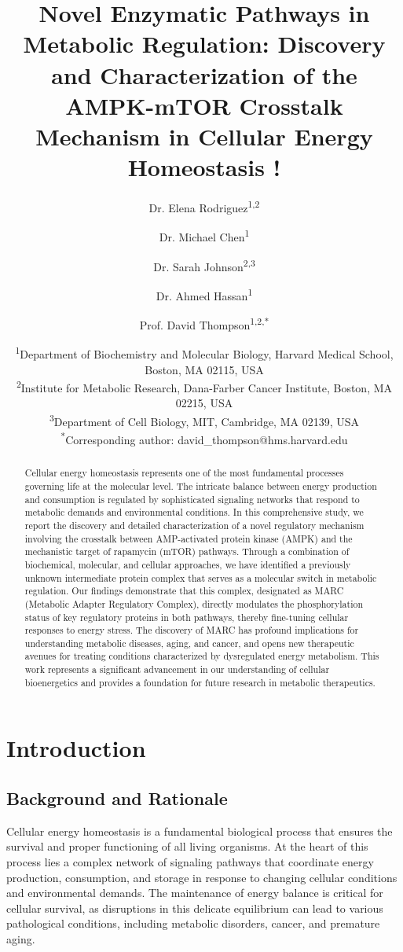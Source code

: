 \documentclass[11pt,a4paper]{article}
\title{Novel Enzymatic Pathways in Metabolic Regulation: Discovery and Characterization of the AMPK-mTOR Crosstalk Mechanism in Cellular Energy Homeostasis !}
\author{Dr. Elena Rodriguez\textsuperscript{1,2} \and 
        Dr. Michael Chen\textsuperscript{1} \and 
        Dr. Sarah Johnson\textsuperscript{2,3} \and 
        Dr. Ahmed Hassan\textsuperscript{1} \and 
        Prof. David Thompson\textsuperscript{1,2,*}}
\date{\textsuperscript{1}Department of Biochemistry and Molecular Biology, Harvard Medical School, Boston, MA 02115, USA\\
\textsuperscript{2}Institute for Metabolic Research, Dana-Farber Cancer Institute, Boston, MA 02215, USA\\
\textsuperscript{3}Department of Cell Biology, MIT, Cambridge, MA 02139, USA\\
\textsuperscript{*}Corresponding author: david\_thompson@hms.harvard.edu}
\begin{document}
\maketitle

\begin{abstract}
Cellular energy homeostasis represents one of the most fundamental processes governing life at the molecular level. The intricate balance between energy production and consumption is regulated by sophisticated signaling networks that respond to metabolic demands and environmental conditions. In this comprehensive study, we report the discovery and detailed characterization of a novel regulatory mechanism involving the crosstalk between AMP-activated protein kinase (AMPK) and the mechanistic target of rapamycin (mTOR) pathways. Through a combination of biochemical, molecular, and cellular approaches, we have identified a previously unknown intermediate protein complex that serves as a molecular switch in metabolic regulation. Our findings demonstrate that this complex, designated as MARC (Metabolic Adapter Regulatory Complex), directly modulates the phosphorylation status of key regulatory proteins in both pathways, thereby fine-tuning cellular responses to energy stress. The discovery of MARC has profound implications for understanding metabolic diseases, aging, and cancer, and opens new therapeutic avenues for treating conditions characterized by dysregulated energy metabolism. This work represents a significant advancement in our understanding of cellular bioenergetics and provides a foundation for future research in metabolic therapeutics.
\end{abstract}

\newpage

\tableofcontents

\newpage

\section{Introduction}

\subsection{Background and Rationale}

Cellular energy homeostasis is a fundamental biological process that ensures the survival and proper functioning of all living organisms. At the heart of this process lies a complex network of signaling pathways that coordinate energy production, consumption, and storage in response to changing cellular conditions and environmental demands. The maintenance of energy balance is critical for cellular survival, as disruptions in this delicate equilibrium can lead to various pathological conditions, including metabolic disorders, cancer, and premature aging.
\end{document}
